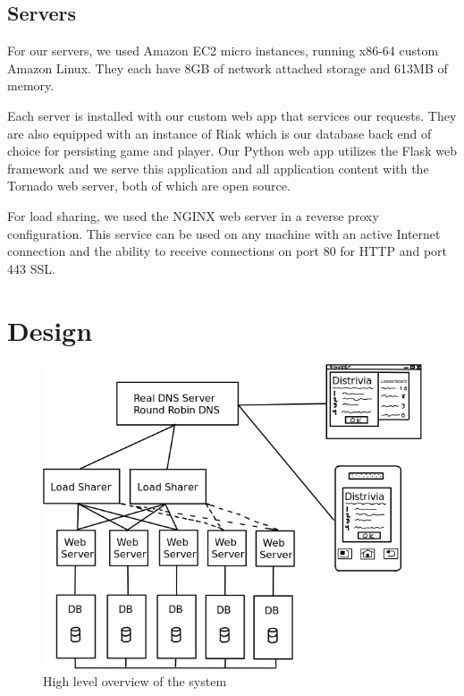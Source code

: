 \documentclass{dependencies/acm_proc_article-sp}
\begin{document}
\subsection{Servers}
For our servers, we used Amazon EC2 micro instances,  running x86-64 custom Amazon Linux.
They each have 8GB of network attached storage and 613MB of memory.

Each server is installed with our custom web app that services our requests.
They are  also equipped with an instance of Riak \cite{riak} which is our database back end of choice for persisting game and player. Our Python web app utilizes the Flask \cite{flask} web framework and we serve this application and all application content with the Tornado \cite{tornado} web server, both of which are open source.

For load sharing, we used the NGINX \cite{nginx} web server in a reverse proxy configuration. This service can be used on any machine with an active Internet connection and the ability to receive connections on port 80 for HTTP and port 443 SSL. 


\section{Design}
\begin{figure}[h!]
  \centering
	\includegraphics[scale=0.4]{diagram.png}
   \caption{High level overview of the system}
 \end{figure}
\end{document}
